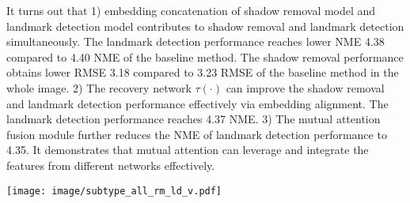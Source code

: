 \documentclass[10pt,twocolumn,letterpaper]{article}
\makeatletter
\DeclareRobustCommand\onedot{\futurelet\@let@token\@onedot}
\def\@onedot{\ifx\@let@token.\else.\null\fi\xspace}
\def\eg{\emph{e.g}\onedot} \def\Eg{\emph{E.g}\onedot}
\def\ie{\emph{i.e}\onedot} \def\Ie{\emph{I.e}\onedot}
\makeatother
\begin{document}
It turns out that 1) embedding concatenation of shadow removal model and landmark detection model contributes to shadow removal and landmark detection simultaneously. The landmark detection performance reaches lower NME 4.38 compared to 4.40 NME of the baseline method. The shadow removal performance obtains lower RMSE 3.18 compared to 3.23 RMSE of the baseline method in the whole image. 2) The recovery network $\tau(\cdot)$ can improve the shadow removal and landmark detection performance effectively via embedding alignment. The landmark detection performance reaches 4.37 NME. 3) The mutual attention fusion module further reduces the NME of landmark detection performance to 4.35. It demonstrates that mutual attention can leverage and integrate the features from different networks effectively.



{\small


}

\newpage
\thispagestyle{empty} %

  
\setcounter{figure}{0}    
\begin{figure*}[ht]
\centering
\texttt{[image: image/subtype\_all\_rm\_ld\_v.pdf]}
\caption{Shadow pattern analysis of shadow removal and landmark detection performance on $\mathcal{D}_\text{syn}$. ($\mathcal{A}$-$\mathcal{C}$): shadow removal (RMSE) and landmark detection (NME) results with shadow removal methods (\ie, MaskShadow-GAN \cite{hu2019mask}, SP+M-Net \cite{le2019shadow}, AEFNet \cite{fu2021auto}, and Ours) and detectors (\ie, SAN \cite{dong2018style} ($\mathcal{A}$), HRNet \cite{wang2020deep} ($\mathcal{B}$), and LUVLi \cite{kumar2020luvli} ($\mathcal{C}$)). (a-d): landmark detection (NME) and shadow removal (RMSE) results of $\mathcal{D}_\text{syn}$ for \textbf{intensity} (a), \textbf{size} (b), \textbf{shape} (c), and \textbf{location} (d). Blue dash line represents the result on clean images by the pre-trained landmark detectors.
Each group along the x-axis represents results on shadow images (\ie, Shadow), and shadow-removed images with four shadow removal methods (\eg, MaskShadow-GAN/SP+M-Net/AEFNet/Ours). Each color represents a severity type. Relative performance gains, \ie, the percent of NME/RMSE drops, after shadow removal compared to shadow images are listed for MaskShadow-GAN, SP+M-Net, AEFNet, and Ours. Note: Shadow-GAN denotes the MaskShadow-GAN.    
}
\label{fig:sub_rm_ld}
\end{figure*}

\end{document}

